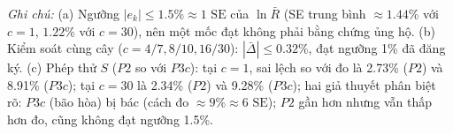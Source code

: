 \medskip\par\raggedright\footnotesize
\textit{Ghi chú:} (a) Ngưỡng $|e_k| \le 1.5\% \approx 1\text{ SE}$ của $\ln\bar R$ (SE trung bình $\approx 1.44\%$ với $c=1$, $1.22\%$ với $c=30$), nên một mốc đạt không phải bằng chứng ủng hộ. (b) Kiểm soát cùng cây ($c = 4/7, 8/10, 16/30$): $|\bar\Delta| \le 0.32\%$, đạt ngưỡng 1\% đã đăng ký. (c) Phép thử $S$ ($P2$ so với $P3c$): tại $c=1$, sai lệch so với đo là 2.73\% ($P2$) và 8.91\% ($P3c$); tại $c=30$ là 2.34\% ($P2$) và 9.28\% ($P3c$); hai giả thuyết phân biệt rõ: $P3c$ (bão hòa) bị bác (cách đo $\approx 9\% \approx 6\text{ SE}$); $P2$ gần hơn nhưng vẫn thấp hơn đo, cũng không đạt ngưỡng 1.5\%.
